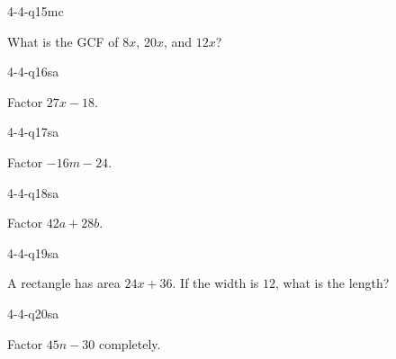 \begin{practiceQuestion}{4-4-q15}{mc}
\begin{questionText}
What is the GCF of $8x$, $20x$, and $12x$?
\end{questionText}
\end{practiceQuestion}


\begin{practiceQuestion}{4-4-q16}{sa}
\begin{questionText}
Factor $27x - 18$.
\end{questionText}
\end{practiceQuestion}

\begin{practiceQuestion}{4-4-q17}{sa}
\begin{questionText}
Factor $-16m - 24$.
\end{questionText}
\end{practiceQuestion}

\begin{practiceQuestion}{4-4-q18}{sa}
\begin{questionText}
Factor $42a + 28b$.
\end{questionText}
\end{practiceQuestion}

\begin{practiceQuestion}{4-4-q19}{sa}
\begin{questionText}
A rectangle has area $24x + 36$. If the width is $12$, what is the length?
\end{questionText}
\end{practiceQuestion}

\begin{practiceQuestion}{4-4-q20}{sa}
\begin{questionText}
Factor $45n - 30$ completely.
\end{questionText}
\end{practiceQuestion}

